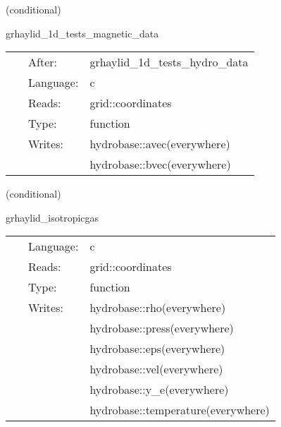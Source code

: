 \documentclass{article}
\begin{document}
\vspace{5mm}

   (conditional) 

\hspace{5mm} grhaylid\_1d\_tests\_magnetic\_data 

\hspace{5mm}{\it set initial magnetic data for 1d test } 


\hspace{5mm}

 \begin{tabular*}{160mm}{cll} 
~ & After:  & grhaylid\_1d\_tests\_hydro\_data \\ 
~ & Language:  & c \\ 
~ & Reads:  & grid::coordinates \\ 
~ & Type:  & function \\ 
~ & Writes:  & hydrobase::avec(everywhere) \\ 
~& ~ &hydrobase::bvec(everywhere)\\ 
\end{tabular*} 


\vspace{5mm}

   (conditional) 

\hspace{5mm} grhaylid\_isotropicgas 

\hspace{5mm}{\it set initial hydrodynamic data for 1d test } 


\hspace{5mm}

 \begin{tabular*}{160mm}{cll} 
~ & Language:  & c \\ 
~ & Reads:  & grid::coordinates \\ 
~ & Type:  & function \\ 
~ & Writes:  & hydrobase::rho(everywhere) \\ 
~& ~ &hydrobase::press(everywhere)\\ 
~& ~ &hydrobase::eps(everywhere)\\ 
~& ~ &hydrobase::vel(everywhere)\\ 
~& ~ &hydrobase::y\_e(everywhere)\\ 
~& ~ &hydrobase::temperature(everywhere)\\ 
\end{tabular*} 


\vspace{5mm}
\end{document}
